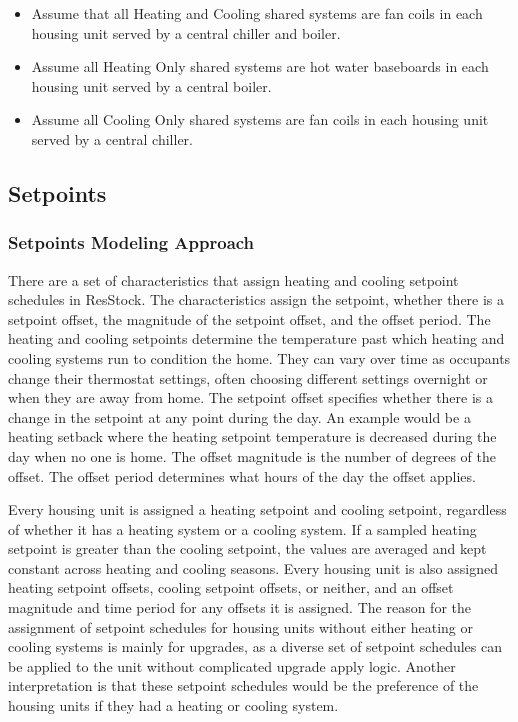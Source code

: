 \begin{itemize}
    \item Assume that all Heating and Cooling shared systems are fan coils in each housing unit served by a central chiller and boiler.
    \item Assume all Heating Only shared systems are hot water baseboards in each housing unit served by a central boiler.
    \item Assume all Cooling Only shared systems are fan coils in each housing unit served by a central chiller.
\end{itemize}
 

\subsection{Setpoints} \label{sec:setpoints}
\subsubsection{Setpoints Modeling Approach}
There are a set of characteristics that assign heating and cooling setpoint schedules in ResStock. The characteristics assign the setpoint, whether there is a setpoint offset, the magnitude of the setpoint offset, and the offset period. The heating and cooling setpoints determine the temperature past which heating and cooling systems run to condition the home. They can vary over time as occupants change their thermostat settings, often choosing different settings overnight or when they are away from home. The setpoint offset specifies whether there is a change in the setpoint at any point during the day. An example would be a heating setback where the heating setpoint temperature is decreased during the day when no one is home. The offset magnitude is the number of degrees of the offset. The offset period determines what hours of the day the offset applies. 

Every housing unit is assigned a heating setpoint and cooling setpoint, regardless of whether it has a heating system or a cooling system. If a sampled heating setpoint is greater than the cooling setpoint, the values are averaged and kept constant across heating and cooling seasons. Every housing unit is also assigned heating setpoint offsets, cooling setpoint offsets, or neither, and an offset magnitude and time period for any offsets it is assigned. The reason for the assignment of setpoint schedules for housing units without either heating or cooling systems is mainly for upgrades, as a diverse set of setpoint schedules can be applied to the unit without complicated upgrade apply logic. Another interpretation is that these setpoint schedules would be the preference of the housing units if they had a heating or cooling system.

